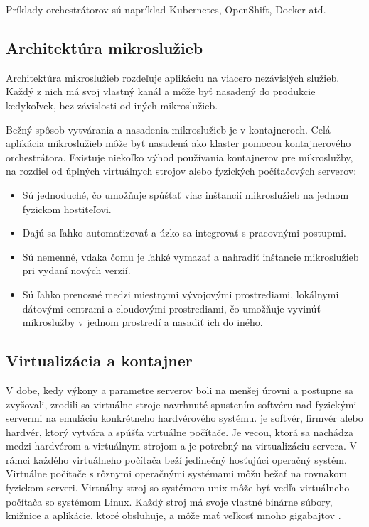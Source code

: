 Príklady orchestrátorov sú napríklad Kubernetes, OpenShift, Docker atď.

\subsection{Architektúra mikroslužieb}

Architektúra mikroslužieb rozdeľuje aplikáciu na viacero nezávislých služieb. Každý z nich má svoj vlastný kanál a môže byť nasadený do produkcie kedykoľvek, bez závislosti od iných mikroslužieb.

Bežný spôsob vytvárania a nasadenia mikroslužieb je v kontajneroch. Celá aplikácia mikroslužieb môže byť nasadená ako klaster pomocou kontajnerového orchestrátora. Existuje niekoľko výhod používania kontajnerov pre mikroslužby, na rozdiel od úplných virtuálnych strojov alebo fyzických počítačových serverov: \cite{microservices}

\begin{itemize}
\item Sú jednoduché, čo umožňuje spúšťať viac inštancií mikroslužieb na jednom fyzickom hostiteľovi.
\item Dajú sa ľahko automatizovať a úzko sa integrovať s pracovnými postupmi.
\item Sú nemenné, vďaka čomu je ľahké vymazať a nahradiť inštancie mikroslužieb pri vydaní nových verzií.
\item Sú ľahko prenosné medzi miestnymi vývojovými prostrediami, lokálnymi dátovými centrami a cloudovými prostrediami, čo umožňuje vyvinúť mikroslužby v jednom prostredí a nasadiť ich do iného.
\end{itemize}

\subsection{Virtualizácia a kontajner}

V dobe, kedy výkony a parametre serverov boli na menšej úrovni a postupne sa zvyšovali, zrodili sa virtuálne stroje navrhnuté spustením softvéru nad fyzickými servermi na emuláciu konkrétneho hardvérového systému.  je softvér, firmvér alebo hardvér, ktorý vytvára a spúšťa virtuálne počítače. Je vecou, ktorá sa nachádza medzi hardvérom a virtuálnym strojom a je potrebný na virtualizáciu servera. V rámci každého virtuálneho počítača beží jedinečný hosťujúci operačný systém. Virtuálne počítače s rôznymi operačnými systémami môžu bežať na rovnakom fyzickom serveri. Virtuálny stroj so systémom \acrshort{unix} môže byť vedľa virtuálneho počítača so systémom Linux. Každý stroj má svoje vlastné binárne súbory, knižnice a aplikácie, ktoré obsluhuje, a môže mať veľkosť mnoho gigabajtov \cite{containersvsvirtual1}.

